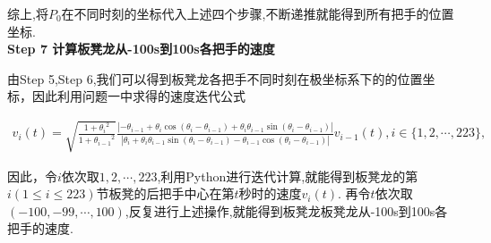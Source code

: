 \documentclass[../main.tex]{subfiles}
\begin{document}
\par 综上,将$P_0$在不同时刻的坐标代入上述四个步骤,不断递推就能得到所有把手的位置坐标.
\\\noindent\textbf{Step 7 计算板凳龙从-100s到100s各把手的速度} 
\par 由Step 5,Step 6,我们可以得到板凳龙各把手不同时刻在极坐标系下的的位置坐标，因此利用问题一中求得的速度迭代公式
\begin{small}
\begin{align}
v_i(t) = \sqrt{\frac{1 + {\theta _i}^2}{1 + {\theta _{i - 1}}^2}}\frac{|-\theta _{i - 1}+\theta _i\cos(\theta _{i }-\theta _{i-1})+\theta _i\theta _{i - 1}\sin(\theta _{i }-\theta _{i-1})|}{|\theta _i+\theta _i\theta _{i - 1}\sin(\theta _i -\theta _{i-1})-\theta _{i - 1}\cos(\theta _i -\theta _{i-1})|} v_{i - 1}(t), i\in \{1, 2, \cdots, 223\},
\end{align}
\end{small}
\par  因此，令\(i\)依次取\(1, 2, \cdots, 223\),利用Python进行迭代计算,就能得到板凳龙的第\(i(1\leqslant i\leqslant 223)\)节板凳的后把手中心在第\(t\)秒时的速度\(v_i(t)\).
再令\(t\)依次取$(-100, -99, \cdots, 100)$,反复进行上述操作,就能得到板凳龙板凳龙从-100s到100s各把手的速度.  
\end{document}
